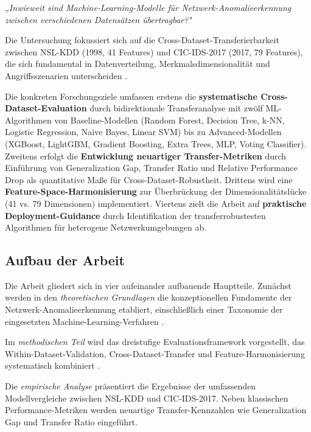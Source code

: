 \documentclass[11pt,a4paper]{article}
\begin{document}
    \textit{„Inwieweit sind Machine-Learning-Modelle für Netzwerk-Anomalieerkennung zwischen verschiedenen Datensätzen übertragbar?"}

    Die Untersuchung fokussiert sich auf die Cross-Dataset-Transferierbarkeit zwischen NSL-KDD (1998, 41 Features) und CIC-IDS-2017 (2017, 79 Features), die sich fundamental in Datenverteilung, Merkmalsdimensionalität und Angriffsszenarien unterscheiden \parencite{Mourouzis2021}.

    Die konkreten Forschungsziele umfassen erstens die \textbf{systematische Cross-Dataset-Evaluation} durch bidirektionale Transferanalyse mit zwölf ML-Algorithmen von Baseline-Modellen (Random Forest, Decision Tree, k-NN, Logistic Regression, Naive Bayes, Linear SVM) bis zu Advanced-Modellen (XGBoost, LightGBM, Gradient Boosting, Extra Trees, MLP, Voting Classifier). Zweitens erfolgt die \textbf{Entwicklung neuartiger Transfer-Metriken} durch Einführung von Generalization Gap, Transfer Ratio und Relative Performance Drop als quantitative Maße für Cross-Dataset-Robustheit. Drittens wird eine \textbf{Feature-Space-Harmonisierung} zur Überbrückung der Dimensionalitätslücke (41 vs. 79 Dimensionen) implementiert. Viertens zielt die Arbeit auf \textbf{praktische Deployment-Guidance} durch Identifikation der transferrobustesten Algorithmen für heterogene Netzwerkumgebungen ab.



    \subsection{Aufbau der Arbeit}

    Die Arbeit gliedert sich in vier aufeinander aufbauende Hauptteile. Zunächst werden in den \textit{theoretischen Grundlagen} die konzeptionellen Fundamente der Netzwerk-Anomalieerkennung etabliert, einschließlich einer Taxonomie der eingesetzten Machine-Learning-Verfahren \parencite{McHugh2000,Vinayakumar2019}.

    Im \textit{methodischen Teil} wird das dreistufige Evaluationsframework vorgestellt, das Within-Dataset-Validation, Cross-Dataset-Transfer und Feature-Harmonisierung systematisch kombiniert \parencite{Gharib2016}.

    Die \textit{empirische Analyse} präsentiert die Ergebnisse der umfassenden Modellvergleiche zwischen NSL-KDD und CIC-IDS-2017. Neben klassischen Performance-Metriken werden neuartige Transfer-Kennzahlen wie Generalization Gap und Transfer Ratio eingeführt.
\end{document}
